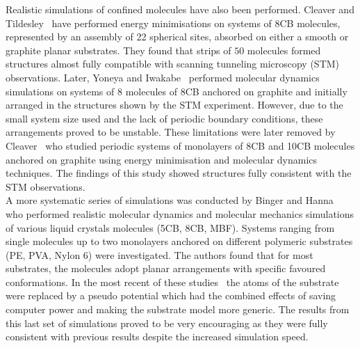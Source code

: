 Realistic simulations of confined molecules have also been performed. Cleaver and
Tildesley~\cite{CleaverTildesley94} have performed energy minimisations on systems of 8CB
molecules, represented by an assembly of 22 spherical sites, absorbed on either a smooth or graphite 
planar substrates. They found that strips of $50$ molecules formed structures almost fully
compatible with scanning tunneling microscopy (STM) observations. Later, Yoneya and 
Iwakabe~\cite{YoneyaIwakabe95} performed molecular dynamics simulations on systems of 8
molecules of 8CB anchored on graphite and initially arranged in the structures shown by the 
STM experiment. However, due to the small system size used and the lack of periodic boundary 
conditions, these arrangements proved to be unstable. These limitations were later 
removed by Cleaver~\etal\cite{CleaverCallaway95} who studied periodic systems of monolayers of
8CB and 10CB molecules anchored on graphite using energy minimisation and molecular dynamics
techniques. The findings of this study showed structures fully consistent with the STM
observations.\\
A more systematic series of simulations was conducted by Binger and
Hanna~\cite{BingerHanna99,BingerHanna00,BingerHanna01} who performed realistic molecular
dynamics and molecular mechanics simulations of various liquid crystals molecules (\eg 5CB, 8CB,
MBF). Systems ranging from single molecules up to two monolayers anchored on different polymeric 
substrates (\eg PE, PVA, Nylon 6) were investigated. The authors found that for most substrates, 
the molecules adopt planar arrangements with specific favoured conformations. 
In the most recent of these studies~\cite{BingerHanna01}
the atoms of the substrate were replaced by a pseudo potential which had the combined
effects of saving computer power and making the substrate model more generic. The results from
this last set of simulations proved to be very encouraging as they were fully consistent 
with previous results despite the increased simulation speed.





